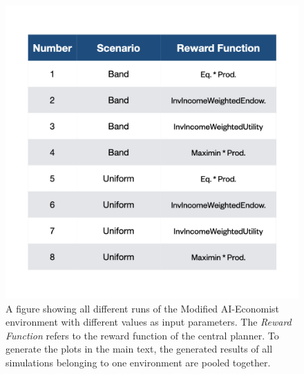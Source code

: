 \documentclass{article}
\begin{document}
\begin{figure}[h!]
	\centering
	\includegraphics[width=0.7\linewidth]{"A_Multi-agent_Reinforcement_Learning_Study_of_Emergence_of_Social_Classes_out_of_Arbitrary_Governance_The_Role_of_Environment_Slides_3/A_Multi-agent_Reinforcement_Learning_Study_of_Emergence_of_Social_Classes_out_of_Arbitrary_Governance_The_Role_of_Environment_Slides_3.001"}
	\caption{A figure showing all different runs of the Modified AI-Economist environment with different values as input parameters. The \textit{Reward Function} refers to the reward function of the central planner. To generate the plots in the main text, the generated results of all simulations belonging to one environment are pooled together.}
	\label{Figure9}
\end{figure}

\newpage
\end{document}
